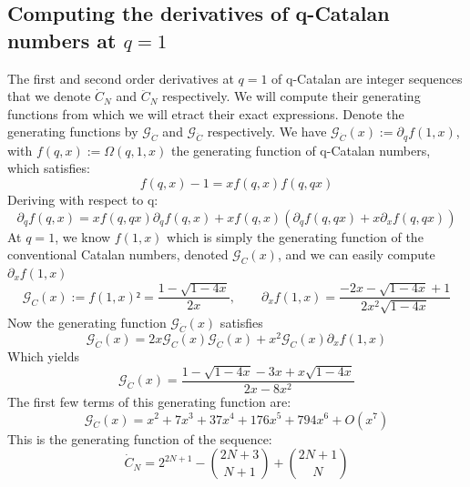 \documentclass[pdflatex,sn-mathphys-num]{sn-jnl}
\theoremstyle{definition}
\theoremstyle{remark}
\numberwithin{equation}{section}
\begin{document}
\begin{appendices}
\section{Computing the derivatives of q-Catalan numbers at $q=1$ }
\label{Derivatives_C}
The first and second order derivatives at $q=1$ of q-Catalan are integer sequences that we denote $\dot{C}_N$ and $\ddot{C}_N$ respectively. We will compute their generating functions from which we will etract their exact expressions.
Denote the generating functions by $\mathcal{G}_{\dot{C}}$ and $\mathcal{G}_{\ddot{C}}$ respectively.
We have $\mathcal{G}_{\dot{C}}(x) := \partial_q f(1,x)$, with $f(q,x) := \Omega(q,1,x)$ the generating function of q-Catalan numbers, which satisfies:
\begin{equation}\label{q_alg}
    f(q,x) - 1 = x f(q,x)f(q,qx)
\end{equation}
Deriving with respect to q:
\begin{equation}
    \partial_q f(q,x) = x f(q,qx) \partial_q f(q,x)
    +
    x f(q,x)(\partial_q f(q,qx)
    +x \partial_x f(q,qx)  )
\end{equation}
At $q=1$, we know $f(1,x)$ which is simply the generating function of the conventional Catalan numbers, denoted $\mathcal{G}_{C}(x)$, and we can easily compute $\partial_x f(1,x)$
\begin{equation}
    \mathcal{G}_{C}(x) := f(1,x) ²=\frac {1-{\sqrt {1-4x}}}{2x}, \qquad
   \partial_x f(1,x) =
   \frac{-2x - \sqrt{1 - 4x} + 1}{2x^2\sqrt{1 - 4x}}
\end{equation}
Now the generating function $\mathcal{G}_{\dot{C}}(x)$ satisfies
\begin{equation}
    \mathcal{G}_{\dot{C}}(x) = 2 x \mathcal{G}_{C}(x) \mathcal{G}_{\dot{C}}(x)
    +
    x^2 \mathcal{G}_{C}(x) \partial_x f(1,x)
\end{equation}
Which yields
\begin{equation}
 \mathcal{G}_{\dot{C}}(x) = \frac{1 - \sqrt{1 - 4x} - 3x + x\sqrt{1 - 4x}}{2x - 8x^2}
\end{equation}
The first few terms of this generating function are:
\begin{equation}
    \mathcal{G}_{\dot{C}}(x) = x^2 + 7 x^3 + 37 x^4 + 176 x^5 + 794 x^6 + O(x^7)
    \label{generating_C_dot}
\end{equation}
This is the generating function of the sequence:
\begin{equation}
    \dot{C}_N = 2^{2N+1} - \binom{2N+3}{N+1} + \binom{2N+1}{N}
\end{equation}


\end{appendices}
\end{document}
